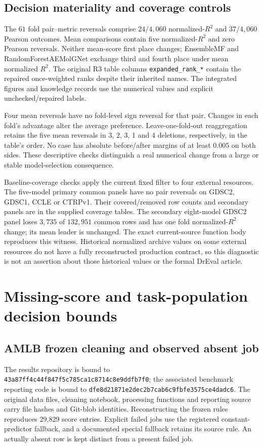 \subsection{Decision materiality and coverage controls}
The $61$ fold pair--metric reversals comprise $24/4{,}060$ normalized-$R^2$ and $37/4{,}060$ Pearson outcomes. Mean comparisons contain five normalized-$R^2$ and zero Pearson reversals. Neither mean-score first place changes; EnsembleMF and RandomForestAEMolGNet exchange third and fourth place under mean normalized $R^2$. The original R3 table columns \texttt{expanded\_rank\_*} contain the repaired once-weighted ranks despite their inherited names. The integrated figures and knowledge records use the numerical values and explicit unchecked/repaired labels.

Four mean reversals have no fold-level sign reversal for that pair. Changes in each fold's advantage alter the average preference. Leave-one-fold-out reaggregation retains the five mean reversals in 3, 2, 3, 1 and 4 deletions, respectively, in the table's order. No case has absolute before/after margins of at least $0.005$ on both sides. These descriptive checks distinguish a real numerical change from a large or stable model-selection consequence.

Baseline-coverage checks apply the current fixed filter to four external resources. The five-model primary common panels have no pair reversals on GDSC2, GDSC1, CCLE or CTRPv1. Their covered/removed row counts and secondary panels are in the supplied coverage tables. The secondary eight-model GDSC2 panel loses $3{,}735$ of $132{,}951$ common rows and has one fold normalized-$R^2$ change; its mean leader is unchanged. The exact current-source function body reproduces this witness. Historical normalized archive values on some external resources do not have a fully reconstructed production contract, so this diagnostic is not an assertion about those historical values or the formal DrEval article.

\section{Missing-score and task-population decision bounds}\label{sec:s19}
\subsection{AMLB frozen cleaning and observed absent job}
The results repository is bound to \nolinkurl{43a87ff4c44f847f5c785ca1c8714c8e9ddfb7f0}; the associated benchmark reporting code is bound to \nolinkurl{dfe8d21871e2dec2b7cab6c9fbfe3575ce4dadc6}. The original data files, cleaning notebook, processing functions and reporting source carry file hashes and Git-blob identities. Reconstructing the frozen rules reproduces 29,829 score entries. Explicit failed jobs use the registered constant-predictor fallback, and a documented special fallback retains its source rule. An actually absent row is kept distinct from a present failed job.

